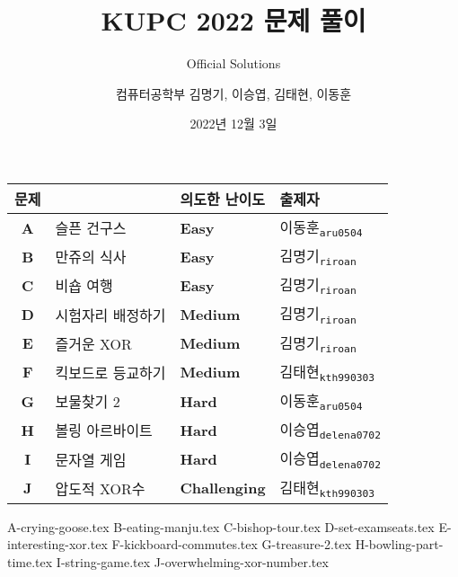 
\usetikzlibrary{arrows.meta,matrix,decorations.pathreplacing}

\title{KUPC 2022 문제 풀이}
\subtitle{Official Solutions}
\author{컴퓨터공학부 김명기, 이승엽, 김태현, 이동훈}
\date{2022년 12월 3일}


    \setcounter{framenumber}{-1}
    \frame{\titlepage}
        
    \begin{frame} %
        \begin{center}
            \begin{tabular}{cl|l|l}
                \hline
                문제 & & 의도한 난이도 & 출제자 \\
                \hline
                \hline

		\textbf{A} & 슬픈 건구스 & \textbf{\color{acbronze}Easy} & 이동훈\textsubscript{\color{kupc-gray}\texttt{aru0504}} \\
                \textbf{B} & 만쥬의 식사& \textbf{\color{acbronze}Easy} & 김명기\textsubscript{\color{kupc-gray}\texttt{riroan}} \\
                \textbf{C} & 비숍 여행 & \textbf{\color{acbronze}Easy} & 김명기\textsubscript{\color{kupc-gray}\texttt{riroan}} \\
                \textbf{D} & 시험자리 배정하기 & \textbf{\color{acsilver}Medium} & 김명기\textsubscript{\color{kupc-gray}\texttt{riroan}} \\
                \textbf{E} & 즐거운 XOR & \textbf{\color{acsilver}Medium} & 김명기\textsubscript{\color{kupc-gray}\texttt{riroan}} \\
                \textbf{F} & 킥보드로 등교하기 & \textbf{\color{acsilver}Medium} & 김태현\textsubscript{\color{kupc-gray}\texttt{kth990303}} \\
                \textbf{G} & 보물찾기 2 & \textbf{\color{acgold}Hard} & 이동훈\textsubscript{\color{kupc-gray}\texttt{aru0504}} \\
                \textbf{H} & 볼링 아르바이트 & \textbf{\color{acgold}Hard} & 이승엽\textsubscript{\color{kupc-gray}\texttt{delena0702}}\\
                \textbf{I} & 문자열 게임 & \textbf{\color{acgold}Hard} & 이승엽\textsubscript{\color{kupc-gray}\texttt{delena0702}} \\
                \textbf{J} & 압도적 XOR수 & \textbf{\color{acgold}Challenging} & 김태현\textsubscript{\color{kupc-gray}\texttt{kth990303}} \\

                \hline
            \end{tabular}
        \end{center}
    \end{frame}
    {A-crying-goose.tex}
    {B-eating-manju.tex}
    {C-bishop-tour.tex}
    {D-set-examseats.tex}
    {E-interesting-xor.tex}
    {F-kickboard-commutes.tex}
    {G-treasure-2.tex}
    {H-bowling-part-time.tex}
    {I-string-game.tex}
    {J-overwhelming-xor-number.tex}


